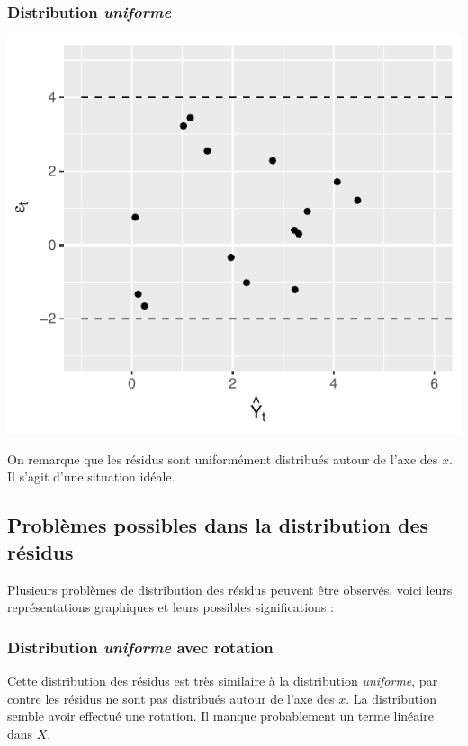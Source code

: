 \documentclass[11pt,french]{report}
\begin{document}
\subsubsection*{Distribution \emph{uniforme}}
\includegraphics{notes_de_cours-031}

\bigskip
On remarque que les résidus sont uniformément distribués autour de l'axe des $x$. Il s'agit d'une situation idéale.

\subsection{Problèmes possibles dans la distribution des résidus}
Plusieurs problèmes de distribution des résidus peuvent être observés, voici leurs représentations graphiques et leurs possibles significations :

\subsubsection{Distribution \emph{uniforme} avec rotation}
Cette distribution des résidus est très similaire à la distribution \emph{uniforme}, par contre les résidus ne sont pas distribués autour de l'axe des $x$. La distribution semble avoir effectué une rotation. Il manque probablement un terme linéaire dans $X$.
\end{document}
